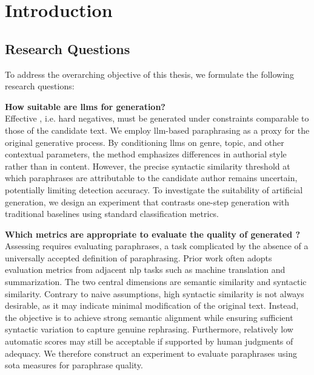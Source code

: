 \chapter{Introduction}
\label{chap:introduction}





\section{Research Questions}
\label{sec:research_questions}
To address the overarching objective of this thesis, we formulate the following research questions:
\begin{questions}
    \item \textbf{How suitable are \acp{llm} for \imp{} generation?} \label{enum:rq1} \hfill \\
    Effective \imps{}, i.e. hard negatives, must be generated under constraints comparable to those of the candidate text. 
    We employ \ac{llm}-based paraphrasing as a proxy for the original generative process. 
    By conditioning \acp{llm} on genre, topic, and other contextual parameters, the \imp{} method emphasizes differences in authorial style rather than in content. 
    However, the precise syntactic similarity threshold at which paraphrases are attributable to the candidate author remains uncertain, potentially limiting detection accuracy. 
    To investigate the suitability of artificial \imp{} generation, we design an experiment that contrasts one-step \imp{} generation with traditional baselines using standard classification metrics.

    \item \textbf{Which metrics are appropriate to evaluate the quality of generated \imps{}?} \label{enum:rq2} \hfill \\
    Assessing \imps{} requires evaluating paraphrases, a task complicated by the absence of a universally accepted definition of paraphrasing. 
    Prior work often adopts evaluation metrics from adjacent \ac{nlp} tasks such as machine translation and summarization. 
    The two central dimensions are semantic similarity and syntactic similarity. 
    Contrary to naive assumptions, high syntactic similarity is not always desirable, as it may indicate minimal modification of the original text.
    Instead, the objective is to achieve strong semantic alignment while ensuring sufficient syntactic variation to capture genuine rephrasing. 
    Furthermore, relatively low automatic scores may still be acceptable if supported by human judgments of adequacy. 
    We therefore construct an experiment to evaluate paraphrases using \acl{sota} measures for paraphrase quality. 


\end{questions}
